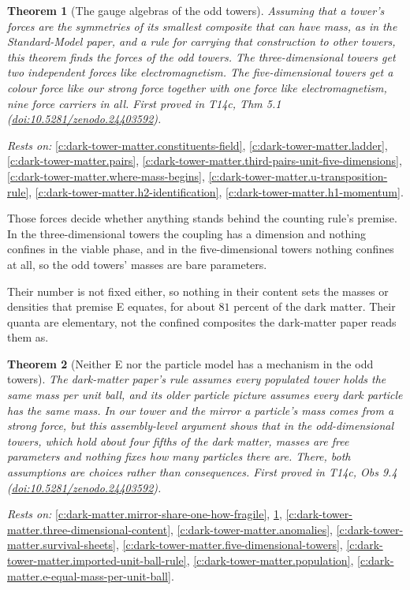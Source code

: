 \documentclass[11pt]{article}
\newtheorem{theorem}{Theorem}[section]
\theoremstyle{definition}
\theoremstyle{plain}
\begin{document}
\begin{theorem}[The gauge algebras of the odd towers]\label{c:dark-tower-matter.gauge-algebras}
Assuming that a tower's forces are the symmetries of its smallest composite that can have mass, as in the Standard-Model paper, and a rule for carrying that construction to other towers, this theorem finds the forces of the odd towers. The three-dimensional towers get two independent forces like electromagnetism. The five-dimensional towers get a colour force like our strong force together with one force like electromagnetism, nine force carriers in all.
\emph{First proved in} T14c, Thm 5.1 (\href{https://doi.org/10.5281/zenodo.24403592}{doi:10.5281/zenodo.24403592}).
\end{theorem}
\noindent\emph{Rests on:} \ref{c:dark-tower-matter.constituents-field}, \ref{c:dark-tower-matter.ladder}, \ref{c:dark-tower-matter.pairs}, \ref{c:dark-tower-matter.third-pairs-unit-five-dimensions}, \ref{c:dark-tower-matter.where-mass-begins}, \ref{c:dark-tower-matter.u-transposition-rule}, \ref{c:dark-tower-matter.h2-identification}, \ref{c:dark-tower-matter.h1-momentum}.

Those forces decide whether anything stands behind the counting rule's premise. In the three-dimensional towers the coupling has a dimension and nothing confines in the viable phase, and in the five-dimensional towers nothing confines at all, so the odd towers' masses are bare parameters.

Their number is not fixed either, so nothing in their content sets the masses or densities that premise E equates, for about $81$ percent of the dark matter. Their quanta are elementary, not the confined composites the dark-matter paper reads them as.

\begin{theorem}[Neither E nor the particle model has a mechanism in the odd towers]\label{c:dark-tower-matter.r1-has-no-mechanism-odd-towers}
The dark-matter paper's rule assumes every populated tower holds the same mass per unit ball, and its older particle picture assumes every dark particle has the same mass. In our tower and the mirror a particle's mass comes from a strong force, but this assembly-level argument shows that in the odd-dimensional towers, which hold about four fifths of the dark matter, masses are free parameters and nothing fixes how many particles there are. There, both assumptions are choices rather than consequences.
\emph{First proved in} T14c, Obs 9.4 (\href{https://doi.org/10.5281/zenodo.24403592}{doi:10.5281/zenodo.24403592}).
\end{theorem}
\noindent\emph{Rests on:} \ref{c:dark-matter.mirror-share-one-how-fragile}, \ref{c:dark-tower-matter.gauge-algebras}, \ref{c:dark-tower-matter.three-dimensional-content}, \ref{c:dark-tower-matter.anomalies}, \ref{c:dark-tower-matter.survival-sheets}, \ref{c:dark-tower-matter.five-dimensional-towers}, \ref{c:dark-tower-matter.imported-unit-ball-rule}, \ref{c:dark-tower-matter.population}, \ref{c:dark-matter.e-equal-mass-per-unit-ball}.
\end{document}
